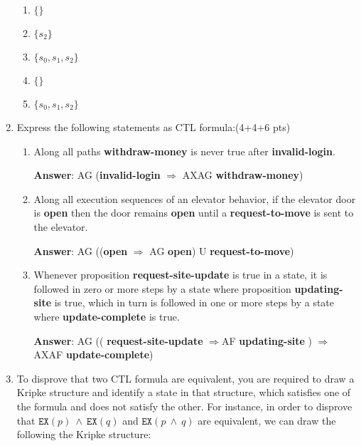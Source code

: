 \documentclass[11pt]{article}
\newcommand{\ex}[1]{\texttt{EX}(#1)}
\begin{document}
\begin{enumerate}
\begin{enumerate}
\item $\{ \}$
  
\item $\{ s_2\}$

\item $\{ s_0, s_1, s_2\}$

\item $\{\}$
  
\item $\{s_0, s_1, s_2\}$
  
\end{enumerate}

\item Express the following statements as CTL formula:\hfill (4+4+6 pts)
\begin{enumerate}

\item
Along all paths \textbf{withdraw-money} is never true after
\textbf{invalid-login}.

\textbf{Answer}: AG (\textbf{invalid-login} $\Rightarrow$ AXAG  \textbf{withdraw-money})

\item
Along all execution sequences of an elevator behavior, if the elevator
door is \textbf{open} then the door remains \textbf{open} until a
\textbf{request-to-move} is sent to the elevator.

\textbf{Answer}: AG ((\textbf{open} $\Rightarrow$ AG  \textbf{open}) U \textbf{request-to-move})

\item 
Whenever proposition \textbf{request-site-update} is true in a state,
it is followed in zero or more steps by a state where proposition
\textbf{updating-site} is true, which in turn is followed in one or
more steps by a state where \textbf{update-complete} is true.

\textbf{Answer}: AG (( \textbf{request-site-update} $\Rightarrow $AF \textbf{updating-site} ) $\Rightarrow$ AXAF \textbf{update-complete})


\end{enumerate}


\item To disprove that two CTL formula are equivalent, you are
  required to draw a Kripke structure and identify a state in that
  structure, which satisfies one of the formula and does not satisfy
  the other. For instance, in order to disprove that
  $\ex{p}\ \land\ \ex{q}$ and $\ex{p\ \land\ q}$ are equivalent, we can
  draw the following the Kripke structure:


\end{enumerate}
\end{document}
